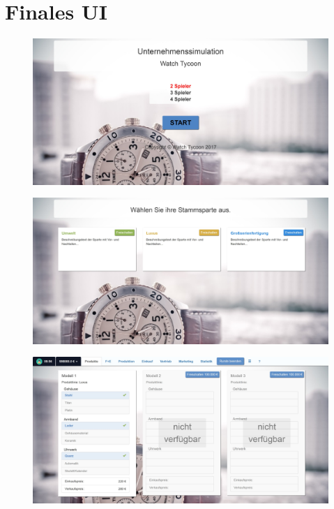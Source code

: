 \section{Finales UI}
\begin{figure} [h]
	\centering
	\includegraphics[scale=0.1]{img/bilder_layout/Spiel1.jpg} 
\end{figure}
\begin{figure} [h]
	\centering
	\includegraphics[scale=0.1]{img/bilder_layout/Spiel2.jpg} 
\end{figure}
\begin{figure} 
	\centering
	\includegraphics[scale=0.1]{img/bilder_layout/Spiel3.jpg} 
\end{figure}
